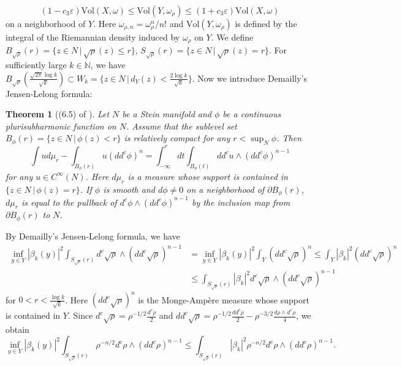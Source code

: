 \documentclass[12pt,oneside]{amsart}
\theoremstyle{plain}
\newtheorem{theorem}{Theorem}
\theoremstyle{definition}
\theoremstyle{remark}
\begin{document}
\begin{equation}\label{equation:10}
(1-c_{3}\varepsilon) \mathrm{Vol}(X, \omega) \leq \mathrm{Vol}(Y, \omega_{\rho}) \leq (1+c_{3}\varepsilon) \mathrm{Vol}(X, \omega)
\end{equation}
on a neighborhood of $Y$.   
Here $\omega_{\rho, n} = \omega_{\rho}^n/n!$ and $\mathrm{Vol}(Y, \omega_{\rho})$ is defined by the integral of the Riemannian density induced by $\omega_{\rho}$ on $Y$.  
We define $B_{\sqrt{\rho}}(r) = \{z \in N\, |\, \sqrt{\rho}(z) \leq r \}$, $S_{\sqrt{\rho}}(r) = \{z \in N\, |\, \sqrt{\rho}(z) = r \}$.  
For sufficiently large $k \in \mathbb{N}$, we have $B_{\sqrt{\rho}}(\frac{\sqrt{2\pi}\log k}{\sqrt{k}}) \subset W_{k} = \{z \in N\,|\, d_{Y}(z) < \frac{2\log k}{\sqrt{k}}\}$.  
Now we introduce Demailly's Jensen-Lelong formula: 
\begin{theorem}[(6.5) of \cite{Dem}]\label{theorem:DJL}
Let $N$ be a Stein manifold and $\phi$ be a continuous plurisubharmonic function on $N$.  
Assume that the sublevel set $B_{\phi}(r) = \{z \in N\, |\,  \phi(z) < r\}$ is relatively compact for any $r < \sup_{N}\phi$.  
Then 
\[
\int u d\mu_{r} - \int_{B_{\phi}(r)} u (dd^c \phi)^n = \int_{-\infty}^{r} dt \int_{B_{\phi}(t)}  dd^c u \wedge (dd^c \phi)^{n-1} 
\]
for any $u \in C^{\infty}(N)$.  
Here $d\mu_r$ is a measure whose support is contained in $\{z \in N\, |\, \phi(z) = r\}$.  
If $\phi$ is smooth and $d\phi \neq 0$ on a neighborhood of $\partial B_{\phi}(r)$, 
$d\mu_r$  is equal to the pullback of $d^c \phi \wedge (dd^c\phi)^{n-1}$ by the inclusion map from $\partial B_{\phi}(r)$ to $N$.   
\end{theorem}
By Demailly's Jensen-Lelong formula, 
we have 
\begin{align*}
\inf_{y \in Y} |\beta_{k}(y)|^2 \int_{S_{\sqrt{\rho}}(r)} d^c \sqrt{\rho} \wedge (dd^c \sqrt{\rho})^{n-1} 
& = \inf_{y \in Y} |\beta_{k}(y)|^2 \int_{Y} (dd^c \sqrt{\rho})^n \leq \int_{Y} |\beta_{k}|^2 (dd^c \sqrt{\rho})^n \\ 
& \leq \int_{S_{\sqrt{\rho}}(r)} |\beta_{k}|^2 d^c \sqrt{\rho} \wedge (dd^c \sqrt{\rho})^{n-1}    
\end{align*}
for $0 < r < \frac{\log k}{\sqrt{k}}$.  
Here $(dd^c \sqrt{\rho})^n$ is the Monge-Amp\`ere measure whose support is contained in $Y$.  
Since $d^c \sqrt{\rho} = \rho^{-1/2}\frac{d^c \rho}{2}$ and 
$dd^c \sqrt{\rho} = \rho^{-1/2}\frac{dd^c \rho}{2}-\rho^{-3/2}\frac{d\rho \wedge d^c\rho}{4}$, 
we obtain 
\[
\inf_{y \in Y} |\beta_{k}(y)|^2 \int_{S_{\sqrt{\rho}}(r)}  \rho^{-n/2}d^{c} \rho \wedge (dd^c \rho)^{n-1} \leq \int_{S_{\sqrt{\rho}}(r)} |\beta_{k}|^2 \rho^{-n/2}d^c \rho \wedge (dd^c \rho)^{n-1} .  
\]
\end{document}

